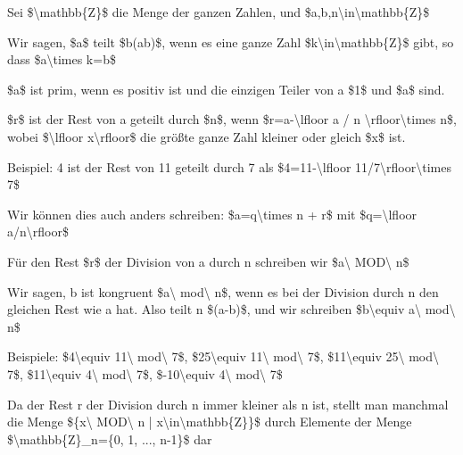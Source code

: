 \documentclass[a4paper]{article}
\begin{document}
\begin{multicols}{3}
      \begin{itemize*}
            \item Sei \$\textbackslash mathbb\{Z\}\$ die Menge der ganzen Zahlen, und
            \$a,b,n\textbackslash in\textbackslash mathbb\{Z\}\$
            \item Wir sagen, \$a\$ teilt \$b(a\textbar b)\$, wenn es eine ganze Zahl
            \$k\textbackslash in\textbackslash mathbb\{Z\}\$ gibt, so dass
            \$a\textbackslash times k=b\$
            \item \$a\$ ist prim, wenn es positiv ist und die einzigen Teiler von a
            \$1\$ und \$a\$ sind.
            \item \$r\$ ist der Rest von a geteilt durch \$n\$, wenn
            \$r=a-\textbackslash lfloor a / n
            \textbackslash rfloor\textbackslash times n\$, wobei
            \$\textbackslash lfloor x\textbackslash rfloor\$ die größte ganze Zahl
            kleiner oder gleich \$x\$ ist.
            \begin{itemize*}
                  \item Beispiel: 4 ist der Rest von 11 geteilt durch 7 als \$4=11-\textbackslash lfloor 11/7\textbackslash rfloor\textbackslash times 7\$
                  \item Wir können dies auch anders schreiben: \$a=q\textbackslash times n + r\$ mit \$q=\textbackslash lfloor a/n\textbackslash rfloor\$
            \end{itemize*}
            \item Für den Rest \$r\$ der Division von a durch n schreiben wir
            \$a\textbackslash{} MOD\textbackslash{} n\$
            \item Wir sagen, b ist kongruent \$a\textbackslash{} mod\textbackslash{}
            n\$, wenn es bei der Division durch n den gleichen Rest wie a hat.
            Also teilt n \$(a-b)\$, und wir schreiben \$b\textbackslash equiv
            a\textbackslash{} mod\textbackslash{} n\$
            \begin{itemize*}
                  \item Beispiele: \$4\textbackslash equiv 11\textbackslash{} mod\textbackslash{} 7\$, \$25\textbackslash equiv 11\textbackslash{} mod\textbackslash{} 7\$, \$11\textbackslash equiv 25\textbackslash{} mod\textbackslash{} 7\$, \$11\textbackslash equiv 4\textbackslash{} mod\textbackslash{} 7\$, \$-10\textbackslash equiv 4\textbackslash{} mod\textbackslash{} 7\$
            \end{itemize*}
            \item Da der Rest r der Division durch n immer kleiner als n ist, stellt man
            manchmal die Menge \$\{x\textbackslash{} MOD\textbackslash{} n
            | x\textbackslash in\textbackslash mathbb\{Z\}\}\$ durch
            Elemente der Menge \$\textbackslash mathbb\{Z\}\_n=\{0, 1, ...,
            n-1\}\$ dar
      \end{itemize*}


\end{multicols}
\end{document}
